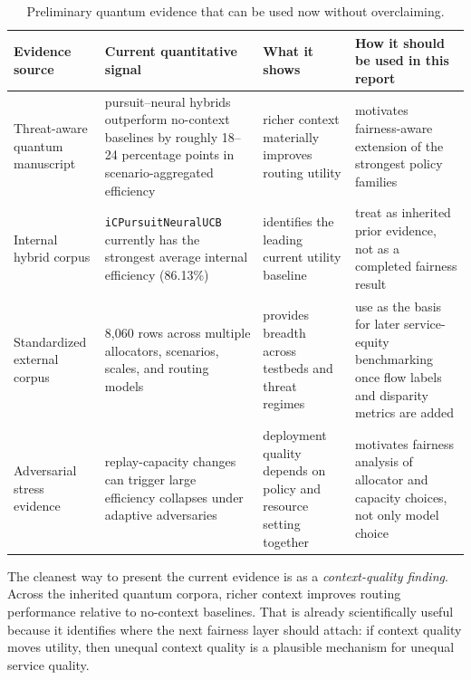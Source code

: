 \documentclass[conference]{IEEEtran}
\begin{document}
\begin{table}[t]
\caption{Preliminary quantum evidence that can be used now without overclaiming.}
\label{tab:quantum_prelim}
\centering
\small
\begin{tabular}{p{}p{}p{}p{}}
\toprule
\textbf{Evidence source} & \textbf{Current quantitative signal} & \textbf{What it shows} & \textbf{How it should be used in this report} \\
\midrule
Threat-aware quantum manuscript & pursuit--neural hybrids outperform no-context baselines by roughly 18--24 percentage points in scenario-aggregated efficiency & richer context materially improves routing utility & motivates fairness-aware extension of the strongest policy families \\
Internal hybrid corpus & \texttt{iCPursuitNeuralUCB} currently has the strongest average internal efficiency (86.13\%) & identifies the leading current utility baseline & treat as inherited prior evidence, not as a completed fairness result \\
Standardized external corpus & 8,060 rows across multiple allocators, scenarios, scales, and routing models & provides breadth across testbeds and threat regimes & use as the basis for later service-equity benchmarking once flow labels and disparity metrics are added \\
Adversarial stress evidence & replay-capacity changes can trigger large efficiency collapses under adaptive adversaries & deployment quality depends on policy and resource setting together & motivates fairness analysis of allocator and capacity choices, not only model choice \\
\bottomrule
\end{tabular}
\end{table}

The cleanest way to present the current evidence is as a \emph{context-quality finding}. Across the inherited quantum corpora, richer context improves routing performance relative to no-context baselines. That is already scientifically useful because it identifies where the next fairness layer should attach: if context quality moves utility, then unequal context quality is a plausible mechanism for unequal service quality.
\end{document}
